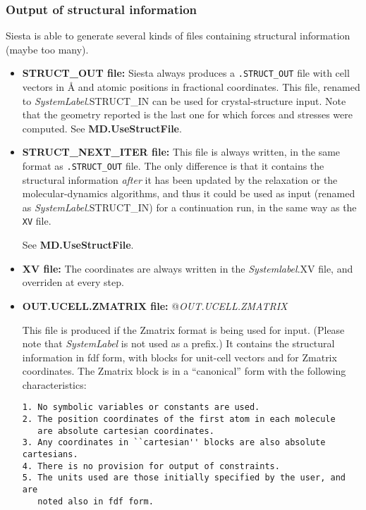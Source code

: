 \documentclass[11pt]{article}
\begin{document}
\subsubsection{Output of structural information}

{\sc Siesta} is able to generate several kinds of files containing
structural information (maybe too many).

\begin{itemize}

\item{\bf STRUCT\_OUT file:}
Siesta always produces a {\tt .STRUCT\_OUT} file with cell vectors in {\AA}
and atomic positions in fractional coordinates. This file, renamed to
{\it SystemLabel}.STRUCT\_IN can be used for crystal-structure input.
Note that the geometry reported is the last one for which forces and
stresses were computed.
See {\bf MD.UseStructFile}.

\item{\bf STRUCT\_NEXT\_ITER file:}
This file is always written, in the same format as {\tt .STRUCT\_OUT}
file. The only difference is that it contains the structural
information {\em after} it has been updated by the relaxation or the
molecular-dynamics
algorithms, and thus it could be used as input (renamed as
{\it SystemLabel}.STRUCT\_IN) for a continuation run, in the same way
as the {\tt XV} file.

See {\bf MD.UseStructFile}.

\item{\bf XV file:} The coordinates are always written in the {\it
  Systemlabel}.XV file, and overriden at every step.

\item{\bf OUT.UCELL.ZMATRIX file:}
@{{\it OUT.UCELL.ZMATRIX}}

This file is produced if the Zmatrix format is being used for
input. (Please note that {\it SystemLabel} is not used as a prefix.)
It contains the structural information in fdf form, with
blocks for unit-cell vectors and for Zmatrix coordinates. The
Zmatrix block is in a ``canonical'' form with the following
characteristics:

\begin{verbatim}
1. No symbolic variables or constants are used.
2. The position coordinates of the first atom in each molecule
   are absolute cartesian coordinates.
3. Any coordinates in ``cartesian'' blocks are also absolute cartesians.
4. There is no provision for output of constraints.
5. The units used are those initially specified by the user, and are
   noted also in fdf form.
\end{verbatim}


\end{itemize}
\end{document}
